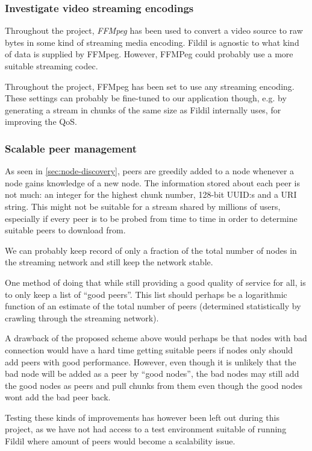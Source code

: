 \documentclass[10pt, a4paper]{article}
\begin{document}
\subsubsection{Investigate video streaming encodings}

Throughout the project, \emph{FFMpeg} has been used to convert a video
source to raw bytes in some kind of streaming media encoding. Fildil
is agnostic to what kind of data is supplied by FFMpeg. However,
FFMPeg could probably use a more suitable streaming codec.

Throughout the project, FFMpeg has been set to use any streaming
encoding. These settings can probably be fine-tuned to our application
though, e.g. by generating a stream in chunks of the same size as
Fildil internally uses, for improving the QoS.

\subsubsection{Scalable peer management}

As seen in \autoref{sec:node-discovery}, peers are greedily added to a
node whenever a node gains knowledge of a new node. The information
stored about each peer is not much: an integer for the highest chunk
number, 128-bit UUID:s and a URI string. This might not be suitable
for a stream shared by millions of users, especially if every peer is
to be probed from time to time in order to determine suitable peers to
download from.

We can probably keep record of only a fraction of the total number of
nodes in the streaming network and still keep the network stable.

One method of doing that while still providing a good quality of
service for all, is to only keep a list of ``good peers''. This list
should perhaps be a logarithmic function of an estimate of the total
number of peers (determined statistically by crawling through the
streaming network).

A drawback of the proposed scheme above would perhaps be that nodes
with bad connection would have a hard time getting suitable peers if
nodes only should add peers with good performance. However, even
though it is unlikely that the bad node will be added as a peer by
``good nodes'', the bad nodes may still add the good nodes as peers
and pull chunks from them even though the good nodes wont add the bad
peer back.

Testing these kinds of improvements has however been left out during
this project, as we have not had access to a test environment suitable
of running Fildil where amount of peers would become a scalability
issue.

\newpage


\end{document}
